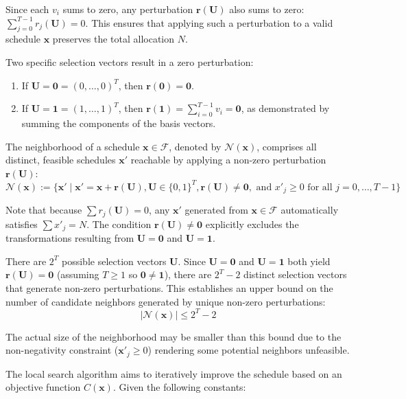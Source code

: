 \documentclass[
  letterpaper,
  DIV=11,
  numbers=noendperiod]{scrartcl}
\begin{document}
Since each \(v_i\) sums to zero, any perturbation
\(\mathbf{r}(\mathbf{U})\) also sums to zero:
\(\sum_{j=0}^{T-1} r_j(\mathbf{U}) = 0\). This ensures that applying
such a perturbation to a valid schedule \(\mathbf{x}\) preserves the
total allocation \(N\).

Two specific selection vectors result in a zero perturbation:

\begin{enumerate}
\def\labelenumi{\arabic{enumi}.}
\item
  If \(\mathbf{U} = \mathbf{0} = (0, \ldots, 0)^T\), then
  \(\mathbf{r}(\mathbf{0}) = \mathbf{0}\).
\item
  If \(\mathbf{U} = \mathbf{1} = (1, \ldots, 1)^T\), then
  \(\mathbf{r}(\mathbf{1}) = \sum_{i=0}^{T-1} v_i = \mathbf{0}\), as
  demonstrated by summing the components of the basis vectors.
\end{enumerate}

The neighborhood of a schedule \(\mathbf{x} \in \mathcal{F}\), denoted
by \(\mathcal{N}(\mathbf{x})\), comprises all distinct, feasible
schedules \(\mathbf{x}'\) reachable by applying a non-zero perturbation
\(\mathbf{r}(\mathbf{U})\):
\[ \mathcal{N}(\mathbf{x}) := \{ \mathbf{x}' \mid \mathbf{x}' = \mathbf{x} + \mathbf{r}(\mathbf{U}), \mathbf{U} \in \{0,1\}^T, \mathbf{r}(\mathbf{U}) \neq \mathbf{0}, \text{ and } x'_j \ge 0 \text{ for all } j = 0, \ldots, T-1 \} \]

Note that because \(\sum r_j(\mathbf{U}) = 0\), any \(\mathbf{x}'\)
generated from \(\mathbf{x} \in \mathcal{F}\) automatically satisfies
\(\sum x'_j = N\). The condition
\(\mathbf{r}(\mathbf{U}) \neq \mathbf{0}\) explicitly excludes the
transformations resulting from \(\mathbf{U}=\mathbf{0}\) and
\(\mathbf{U}=\mathbf{1}\).

There are \(2^T\) possible selection vectors \(\mathbf{U}\). Since
\(\mathbf{U}=\mathbf{0}\) and \(\mathbf{U}=\mathbf{1}\) both yield
\(\mathbf{r}(\mathbf{U}) = \mathbf{0}\) (assuming \(T \ge 1\) so
\(\mathbf{0} \neq \mathbf{1}\)), there are \(2^T - 2\) distinct
selection vectors that generate non-zero perturbations. This establishes
an upper bound on the number of candidate neighbors generated by unique
non-zero perturbations: \[ |\mathcal{N}(\mathbf{x})| \le 2^T - 2 \]

The actual size of the neighborhood may be smaller than this bound due
to the non-negativity constraint (\(\mathbf{x}'_j \ge 0\)) rendering
some potential neighbors unfeasible.

The local search algorithm aims to iteratively improve the schedule
based on an objective function \(C(\mathbf{x})\). Given the following
constants:
\end{document}
